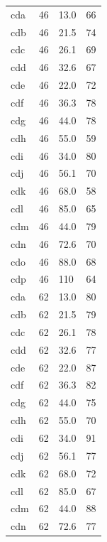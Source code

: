\documentclass[draft]{assets/agujournal2019}
\begin{document}
\begin{longtable}{A{0.13} B{0.12} B{0.12} B{0.10}}
 cda        & 46         & 13.0       & 66    \\
 cdb        & 46         & 21.5       & 74    \\
 cdc        & 46         & 26.1       & 69    \\
 cdd        & 46         & 32.6       & 67    \\
 cde        & 46         & 22.0       & 72    \\
 cdf        & 46         & 36.3       & 78    \\
 cdg        & 46         & 44.0       & 78    \\
 cdh        & 46         & 55.0       & 59    \\
 cdi        & 46         & 34.0       & 80    \\
 cdj        & 46         & 56.1       & 70    \\
 cdk        & 46         & 68.0       & 58    \\
 cdl        & 46         & 85.0       & 65    \\
 cdm        & 46         & 44.0       & 79    \\
 cdn        & 46         & 72.6       & 70    \\
 cdo        & 46         & 88.0       & 68    \\
 cdp        & 46         & 110        & 64    \\
 cda        & 62         & 13.0       & 80    \\
 cdb        & 62         & 21.5       & 79    \\
 cdc        & 62         & 26.1       & 78    \\
 cdd        & 62         & 32.6       & 77    \\
 cde        & 62         & 22.0       & 87    \\
 cdf        & 62         & 36.3       & 82    \\
 cdg        & 62         & 44.0       & 75    \\
 cdh        & 62         & 55.0       & 70    \\
 cdi        & 62         & 34.0       & 91    \\
 cdj        & 62         & 56.1       & 77    \\
 cdk        & 62         & 68.0       & 72    \\
 cdl        & 62         & 85.0       & 67    \\
 cdm        & 62         & 44.0       & 88    \\
 cdn        & 62         & 72.6       & 77    \\

\end{longtable}
\end{document}
